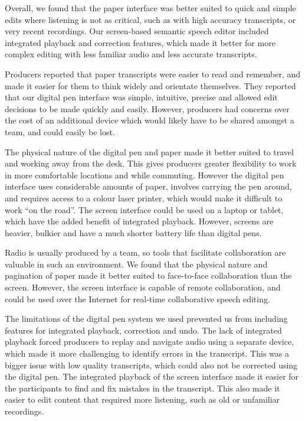Overall, we found that the paper interface was better suited to quick and simple edits where listening is not as
critical, such as with high accuracy transcripts, or very recent recordings.  Our screen-based semantic speech editor
included integrated playback and correction features, which made it better for more complex editing with less familiar
audio and less accurate transcripts.

Producers reported that paper transcripts were easier to read and remember, and made it easier for them to think widely
and orientate themselves.  They reported that our digital pen interface was simple, intuitive, precise and allowed edit
decisions to be made quickly and easily.  However, producers had concerns over the cost of an additional device which
would likely have to be shared amongst a team, and could easily be lost.

The physical nature of the digital pen and paper made it better suited to travel and working away from the desk. This
gives producers greater flexibility to work in more comfortable locations and while commuting.  However the digital pen
interface uses considerable amounts of paper, involves carrying the pen around, and requires access to a colour laser
printer, which would make it difficult to work ``on the road''.  The screen interface could be used on a laptop or
tablet, which have the added benefit of integrated playback. However, screens are heavier, bulkier and have a much
shorter battery life than digital pens.

Radio is usually produced by a team, so tools that facilitate collaboration are valuable in such an environment.  We
found that the physical nature and pagination of paper made it better suited to face-to-face collaboration than the
screen.  However, the screen interface is capable of remote collaboration, and could be used over the Internet for
real-time collaborative speech editing.

The limitations of the digital pen system we used prevented us from including features for integrated playback,
correction and undo. The lack of integrated playback forced producers to replay and navigate audio using a separate
device, which made it more challenging to identify errors in the transcript. This was a bigger issue with low
quality transcripts, which could also not be corrected using the digital pen.  The integrated playback of the screen
interface made it easier for the participants to find and fix mistakes in the transcript.  This also made it
easier to edit content that required more listening, such as old or unfamiliar recordings.


